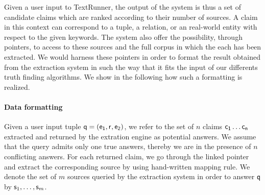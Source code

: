 
Given a user input to TextRunner, the output of the system is thus a set of candidate claims which are ranked according 
to their number of sources. A claim in this context can correspond to a tuple, a relation, or an real-world entity with respect
to the given keywords. The system
also offer the possibility, through pointers, to access to these sources and the full corpus in which the each has been extracted.
We would harness these pointers in order to format the result obtained from the extraction system  in such the way that it fits the input of our differents truth finding algorithms. We show in the following how such a 
formatting is realized.

\paragraph*{Data formatting}
Given a user input tuple $\mathsf{q}=(\mathsf{e_{1}}, \mathsf{r}_{},\mathsf{e_{2}})$, we refer to the
set of $n$ claims $\mathsf{c_{1}}\ldots \mathsf{c_{n}}$ extracted and returned by the
extration engine as potential answers. 
We assume that the query admits only one true answers, thereby we are in the presence of
$n$ conflicting answers. For each returned claim, we go through the linked pointer and extract the
corresponding source by using hand-written mapping rule. We denote the set of $m$ sources queried by 
the extraction system in order to answer $\mathsf{q}$ by $\mathsf{s}_{1}, \ldots, \mathsf{s}_{m}$.